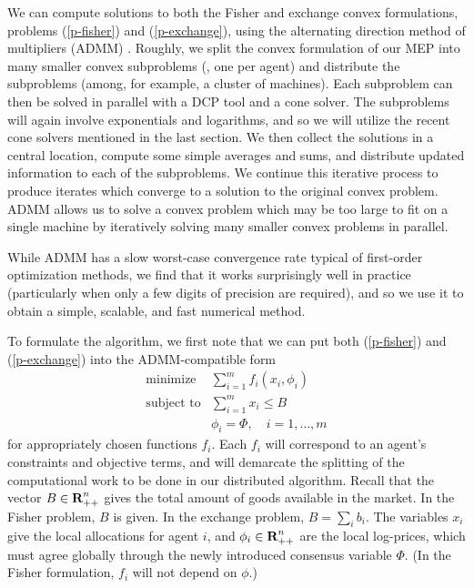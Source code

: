 \documentclass[12pt]{article}
\begin{document}
We can compute solutions to both the Fisher and exchange convex formulations,
problems (\ref{p-fisher}) and (\ref{p-exchange}), using the alternating
direction method of multipliers (ADMM) \cite{boyd2011distributed}. Roughly, we
split the convex formulation of our MEP into many smaller convex subproblems
(\eg, one per agent) and distribute the subproblems (among, for example, a cluster
of machines).
Each subproblem can then be solved in parallel with a DCP tool and a cone solver.
The subproblems will again involve exponentials and logarithms, and so we will
utilize the recent cone solvers mentioned in the last section.
We then collect the solutions in a central location,
compute some simple averages and sums, and distribute updated
information to each of the subproblems.
We continue this iterative process to produce iterates which converge
to a solution to the original convex problem.
ADMM allows us to solve a convex problem which may be too large to fit on
a single machine by iteratively solving many smaller convex problems in parallel.

While ADMM has a slow worst-case convergence rate typical of first-order
optimization methods, we find that it works surprisingly well in practice
(particularly when only a few digits of precision are required), and so we
use it to obtain a simple, scalable, and fast numerical method.

To formulate the algorithm, we first note that we can put both (\ref{p-fisher}) and (\ref{p-exchange}) into
the ADMM-compatible form
\begin{equation}
\label{p-admm}
\begin{array}{ll}
\mbox{minimize} & \sum_{i=1}^m f_i(x_i, \phi_i) \\
\mbox{subject to} & \sum_{i=1}^m x_i \leq B\\
& \phi_i = \Phi, \quad i=1,\ldots,m
\end{array}
\end{equation}
for appropriately chosen functions $f_i$. Each $f_i$ will
correspond to an agent's constraints and objective terms, and will
demarcate the splitting of the computational work to be done in
our distributed algorithm. Recall that the vector $B \in
{\mbox{\bf R}}^n_{++}$ gives the total amount of goods available in the market. In the
Fisher problem, $B$ is given. In the exchange problem, $B = \sum_i b_i$. The
variables $x_i$ give the local allocations for agent $i$, and $\phi_i \in
{\mbox{\bf R}}^n_{++}$ are the local log-prices, which must agree globally through the
newly introduced consensus variable $\Phi$. (In the Fisher formulation, $f_i$
will not depend on $\phi$.)
\end{document}
